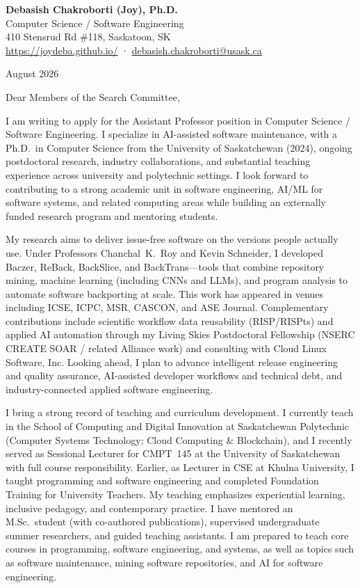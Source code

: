 \documentclass[10pt]{letter}
\begin{document}
\begin{center}
{\large\bfseries Debasish Chakroborti (Joy), Ph.D.}\\[0.2em]
Computer Science / Software Engineering\\
410 Stensrud Rd \#118, Saskatoon, SK\\
\href{https://joydeba.github.io/}{https://joydeba.github.io/} ·
\href{mailto:debasish.chakroborti@usask.ca}{debasish.chakroborti@usask.ca}
\end{center}

\vspace{0.3em}
\noindent August 2026

\vspace{0.2em}
\noindent Dear Members of the Search Committee,

I am writing to apply for the Assistant Professor position in Computer Science / Software Engineering. I specialize in AI-assisted software maintenance, with a Ph.D.\ in Computer Science from the University of Saskatchewan (2024), ongoing postdoctoral research, industry collaborations, and substantial teaching experience across university and polytechnic settings. I look forward to contributing to a strong academic unit in software engineering, AI/ML for software systems, and related computing areas while building an externally funded research program and mentoring students.

My research aims to deliver issue-free software on the versions people actually use. Under Professors Chanchal~K.~Roy and Kevin Schneider, I developed Baczer, ReBack, BackSlice, and BackTrans---tools that combine repository mining, machine learning (including CNNs and LLMs), and program analysis to automate software backporting at scale. This work has appeared in venues including ICSE, ICPC, MSR, CASCON, and ASE Journal. Complementary contributions include scientific workflow data reusability (RISP/RISPts) and applied AI automation through my Living Skies Postdoctoral Fellowship (NSERC CREATE SOAR / related Alliance work) and consulting with Cloud Linux Software, Inc. Looking ahead, I plan to advance intelligent release engineering and quality assurance, AI-assisted developer workflows and technical debt, and industry-connected applied software engineering.

I bring a strong record of teaching and curriculum development. I currently teach in the School of Computing and Digital Innovation at Saskatchewan Polytechnic (Computer Systems Technology; Cloud Computing \& Blockchain), and I recently served as Sessional Lecturer for CMPT~145 at the University of Saskatchewan with full course responsibility. Earlier, as Lecturer in CSE at Khulna University, I taught programming and software engineering and completed Foundation Training for University Teachers. My teaching emphasizes experiential learning, inclusive pedagogy, and contemporary practice. I have mentored an M.Sc.\ student (with co-authored publications), supervised undergraduate summer researchers, and guided teaching assistants. I am prepared to teach core courses in programming, software engineering, and systems, as well as topics such as software maintenance, mining software repositories, and AI for software engineering.
\end{document}
